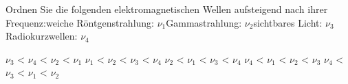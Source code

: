 \documentclass[11pt]{exam}
\begin{document}
\begin{questions}
\vspace{3mm}\question Ordnen Sie die folgenden elektromagnetischen Wellen aufsteigend nach ihrer Frequenz:weiche Röntgenstrahlung: \( \nu_1 \)Gammastrahlung: \( \nu_2 \)sichtbares Licht: \( \nu_3 \)Radiokurzwellen: \( \nu_4 \)

\begin{choices}
	\choice \( \nu_3 \) < \( \nu_4 \) < \( \nu_2 \) < \( \nu_1 \)
	\choice \( \nu_1 \) < \( \nu_2 \) < \( \nu_3 \) < \( \nu_4 \)
	\choice \( \nu_2 \) < \( \nu_1 \) < \( \nu_3 \) < \( \nu_4 \)
	\choice \( \nu_4 \) < \( \nu_1 \) < \( \nu_2 \) < \( \nu_3 \)
	\choice \( \nu_4 \) < \( \nu_3 \) < \( \nu_1 \) < \( \nu_2 \)
\end{choices}

\vspace{3mm}\end{questions}
\end{document}

